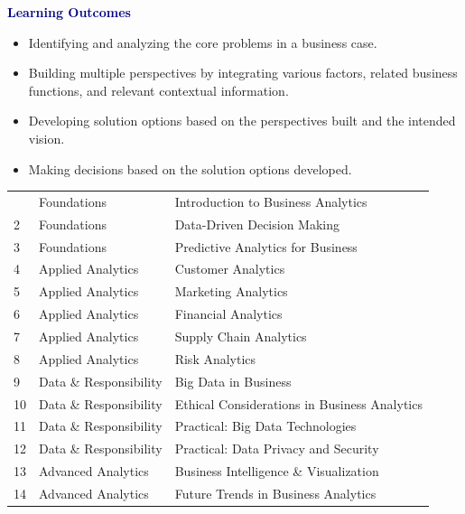 \begin{minipage}[t]{.66\textwidth}\vspace{0pt}
\textcolor{navy}{\large\bfseries Learning Outcomes}\par
\begin{itemize}
\item Identifying and analyzing the core problems in a business case.
\item Building multiple perspectives by integrating various factors, related business functions, and relevant contextual information.
\item Developing solution options based on the perspectives built and the intended vision.
\item Making decisions based on the solution options developed.
\end{itemize}
\end{minipage}\hfill
\begin{minipage}[t]{.32\textwidth}\vspace{0pt}
\end{minipage}
\begin{tabularx}{\textwidth}{M{1.8cm}YY}&Foundations&Introduction to Business Analytics\\
2&Foundations&Data-Driven Decision Making\\
3&Foundations&Predictive Analytics for Business\\
4&Applied Analytics&Customer Analytics\\
5&Applied Analytics&Marketing Analytics\\
6&Applied Analytics&Financial Analytics\\
7&Applied Analytics&Supply Chain Analytics\\
8&Applied Analytics&Risk Analytics\\
9&Data \& Responsibility&Big Data in Business\\
10&Data \& Responsibility&Ethical Considerations in Business Analytics\\
11&Data \& Responsibility&Practical: Big Data Technologies\\
12&Data \& Responsibility&Practical: Data Privacy and Security\\
13&Advanced Analytics&Business Intelligence \& Visualization\\
14&Advanced Analytics&Future Trends in Business Analytics\\
\end{tabularx}
